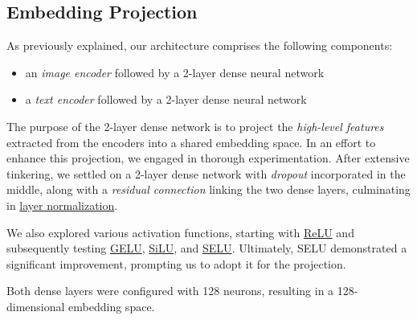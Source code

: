 \documentclass[12pt, a4paper]{article}
\begin{document}
\subsection{Embedding Projection}
As previously explained, our architecture comprises the following components:
\begin{itemize}
    \item an \textit{image encoder} followed by a 2-layer dense neural network
    \item a \textit{text encoder} followed by a 2-layer dense neural network
\end{itemize}
The purpose of the 2-layer dense network is to project the \textit{high-level features} extracted from the encoders into a shared embedding space.
In an effort to enhance this projection, we engaged in thorough experimentation.
After extensive tinkering, we settled on a 2-layer dense network with \textit{dropout} incorporated in the middle, along with a \textit{residual connection} linking the two dense layers, culminating in \href{https://keras.io/api/layers/normalization_layers/layer_normalization/}{layer normalization}.

We also explored various activation functions, starting with \href{https://keras.io/api/layers/activation_layers/relu/}{ReLU} and subsequently testing \href{https://www.tensorflow.org/api_docs/python/tf/keras/activations/gelu}{GELU}, \href{https://www.tensorflow.org/api_docs/python/tf/nn/silu}{SiLU}, and \href{https://www.tensorflow.org/api_docs/python/tf/nn/selu}{SELU}. Ultimately, SELU demonstrated a significant improvement, prompting us to adopt it for the projection.

Both dense layers were configured with 128 neurons, resulting in a 128-dimensional embedding space.

\begin{center}
\end{center}    
\end{document}
